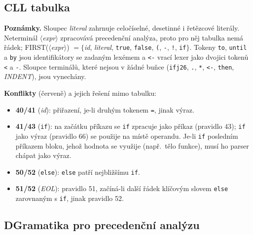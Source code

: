 \documentclass[11pt]{article}
\newif\ifdraft
\newcommand{\todo}[1]{\ifdraft{\color{red}\textbf{[TODO: #1]}}\fi}
\newcommand{\nt}[1]{$\langle$\textit{#1}$\rangle$}   %
\newcommand{\cf}[1]{\textcolor{red!70!black}{\textbf{#1}}} %
\begin{document}

\clearpage

\begin{landscape}
\thispagestyle{empty}
\subsection*{C\quad LL tabulka}
\label{sec:ll-tab}
\begin{center}
\resizebox{0.8\linewidth}{!}{}
\end{center}
\par\small
\textbf{Poznámky.} Sloupec \textit{literal} zahrnuje celočíselné, desetinné i řetězcové literály. Neterminál \nt{expr} zpracovává precedenční analýza, proto pro něj tabulka nemá řádek; FIRST(\nt{expr}) $=\{$\textit{id}, \textit{literal}, \texttt{true}, \texttt{false}, \texttt{(}, \texttt{-}, \texttt{!}, \texttt{if}$\}$. Tokeny \texttt{to}, \texttt{until} a \texttt{by} jsou identifikátory se zadaným lexémem a \texttt{<-} vrací lexer jako dvojici tokenů \texttt{<} a \texttt{-}. Sloupce terminálů, které nejsou v žádné buňce (\texttt{ifj26}, \texttt{.}, \texttt{*}, \texttt{<-}, \texttt{then}, \textit{INDENT}), jsou vynechány.

\textbf{Konflikty} (červeně) a jejich řešení mimo tabulku:
\begin{itemize}[itemsep=1pt]
  \item[] \cf{40/41} (\textit{id}): přiřazení, je-li druhým tokenem \texttt{=}, jinak výraz.
  \item[] \cf{41/43} (\texttt{if}): na začátku příkazu se \texttt{if} zpracuje jako příkaz (pravidlo 43); \texttt{if} jako výraz (pravidlo 66) se použije na místě operandu. Je-li \texttt{if} posledním příkazem bloku, jehož hodnota se využije (např.\ tělo funkce), musí ho parser chápat jako výraz. \todo{ověřit, jak to parser řeší}
  \item[] \cf{50/52} (\texttt{else}): \texttt{else} patří nejbližšímu \texttt{if}.
  \item[] \cf{51/52} (\textit{EOL}): pravidlo 51, začíná-li další řádek klíčovým slovem \texttt{else} zarovnaným s \texttt{if}, jinak pravidlo 52.
\end{itemize}
\end{landscape}

\subsection*{D\quad Gramatika pro precedenční analýzu}
\label{sec:psa-gram}

\end{document}
